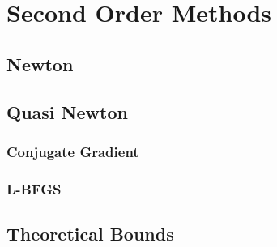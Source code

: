 
\chapter{Second Order Methods}

\section{Newton}

\section{Quasi Newton}

\subsection{Conjugate Gradient}
\subsection{L-BFGS}

\section{Theoretical Bounds}


\endinput

